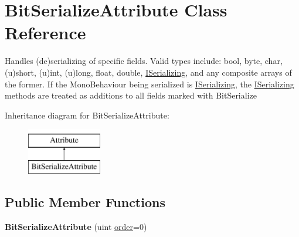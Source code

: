 \hypertarget{class_bit_serialize_attribute}{\section{Bit\-Serialize\-Attribute Class Reference}
\label{class_bit_serialize_attribute}
}


Handles (de)serializing of specific fields. Valid types include\-: bool, byte, char, (u)short, (u)int, (u)long, float, double, \hyperlink{interface_i_serializing}{I\-Serializing}, and any composite arrays of the former. If the Mono\-Behaviour being serialized is \hyperlink{interface_i_serializing}{I\-Serializing}, the \hyperlink{interface_i_serializing}{I\-Serializing} methods are treated as additions to all fields marked with Bit\-Serialize  


Inheritance diagram for Bit\-Serialize\-Attribute\-:\begin{figure}[H]
\begin{center}
\leavevmode
\includegraphics[height=2.000000cm]{class_bit_serialize_attribute}
\end{center}
\end{figure}
\subsection*{Public Member Functions}
\begin{DoxyCompactItemize}
\item 
\hypertarget{class_bit_serialize_attribute_a28774b3727990228edb19840f2e9badd}{{\bfseries Bit\-Serialize\-Attribute} (uint \hyperlink{class_bit_serialize_attribute_ad0a026f7b3c5c95879852db7a66a2726}{order}=0)}\label{class_bit_serialize_attribute_a28774b3727990228edb19840f2e9badd}

\end{DoxyCompactItemize}
